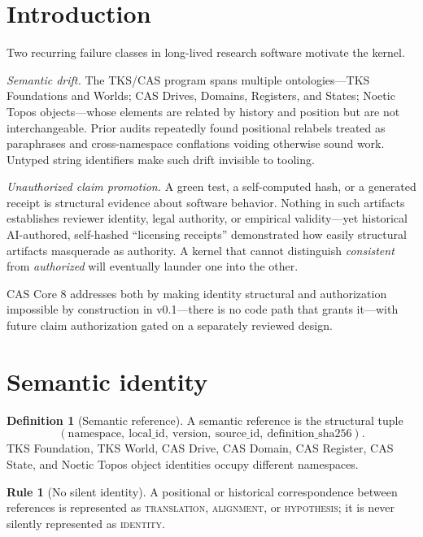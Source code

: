 \documentclass[11pt]{amsart}
\theoremstyle{definition}
\newtheorem{definition}[theorem]{Definition}
\newtheorem{ruleenv}[theorem]{Rule}
\theoremstyle{remark}
\begin{document}
\section{Introduction}

Two recurring failure classes in long-lived research software motivate the kernel.

\emph{Semantic drift.} The TKS/CAS program spans multiple ontologies---TKS Foundations and Worlds; CAS Drives, Domains, Registers, and States; Noetic Topos objects---whose elements are related by history and position but are not interchangeable. Prior audits repeatedly found positional relabels treated as paraphrases and cross-namespace conflations voiding otherwise sound work. Untyped string identifiers make such drift invisible to tooling.

\emph{Unauthorized claim promotion.} A green test, a self-computed hash, or a generated receipt is structural evidence about software behavior. Nothing in such artifacts establishes reviewer identity, legal authority, or empirical validity---yet historical AI-authored, self-hashed ``licensing receipts'' demonstrated how easily structural artifacts masquerade as authority. A kernel that cannot distinguish \emph{consistent} from \emph{authorized} will eventually launder one into the other.

CAS Core 8 addresses both by making identity structural and authorization impossible by construction in v0.1---there is no code path that grants it---with future claim authorization gated on a separately reviewed design.

\section{Semantic identity}

\begin{definition}[Semantic reference]\label{def:semref}
A semantic reference is the structural tuple
\[
(\text{namespace},\ \text{local\_id},\ \text{version},\ \text{source\_id},\ \text{definition\_sha256}).
\]
TKS Foundation, TKS World, CAS Drive, CAS Domain, CAS Register, CAS State, and Noetic Topos object identities occupy different namespaces.
\end{definition}

\begin{ruleenv}[No silent identity]\label{rule:noid}
A positional or historical correspondence between references is represented as \textsc{translation}, \textsc{alignment}, or \textsc{hypothesis}; it is never silently represented as \textsc{identity}.
\end{ruleenv}
\end{document}
